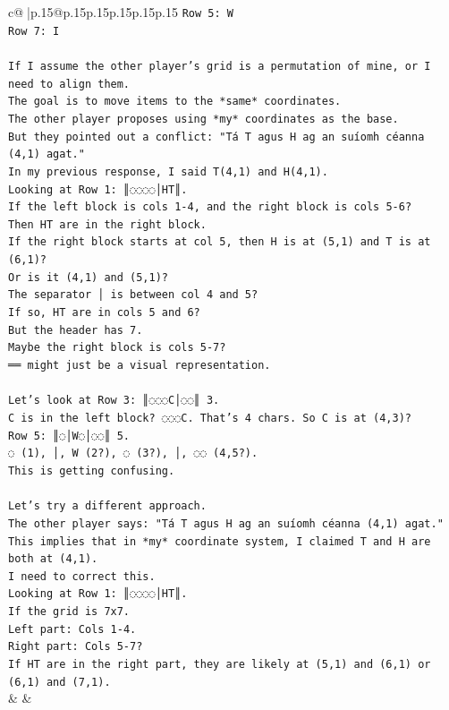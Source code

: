 \documentclass{article}
\begin{document}
{\begin{supertabular}{c@{$\;$}|p{.15\linewidth}@{}p{.15\linewidth}p{.15\linewidth}p{.15\linewidth}p{.15\linewidth}p{.15\linewidth}}
{{{\texttt{Row 5: W} \\
\texttt{Row 7: I} \\
\\ 
\texttt{If I assume the other player's grid is a permutation of mine, or I need to align them.} \\
\texttt{The goal is to move items to the *same* coordinates.} \\
\texttt{The other player proposes using *my* coordinates as the base.} \\
\texttt{But they pointed out a conflict: "Tá T agus H ag an suíomh céanna (4,1) agat."} \\
\texttt{In my previous response, I said T(4,1) and H(4,1).} \\
\texttt{Looking at Row 1: ║◌◌◌◌│HT║.} \\
\texttt{If the left block is cols 1{-}4, and the right block is cols 5{-}6?} \\
\texttt{Then HT are in the right block.} \\
\texttt{If the right block starts at col 5, then H is at (5,1) and T is at (6,1)?} \\
\texttt{Or is it (4,1) and (5,1)?} \\
\texttt{The separator │ is between col 4 and 5?} \\
\texttt{If so, HT are in cols 5 and 6?} \\
\texttt{But the header has 7.} \\
\texttt{Maybe the right block is cols 5{-}7?} \\
\texttt{══ might just be a visual representation.} \\
\\ 
\texttt{Let's look at Row 3: ║◌◌◌C│◌◌║ 3.} \\
\texttt{C is in the left block? ◌◌◌C. That's 4 chars. So C is at (4,3)?} \\
\texttt{Row 5: ║◌│W◌│◌◌║ 5.} \\
\texttt{◌ (1), │, W (2?), ◌ (3?), │, ◌◌ (4,5?).} \\
\texttt{This is getting confusing.} \\
\\ 
\texttt{Let's try a different approach.} \\
\texttt{The other player says: "Tá T agus H ag an suíomh céanna (4,1) agat."} \\
\texttt{This implies that in *my* coordinate system, I claimed T and H are both at (4,1).} \\
\texttt{I need to correct this.} \\
\texttt{Looking at Row 1: ║◌◌◌◌│HT║.} \\
\texttt{If the grid is 7x7.} \\
\texttt{Left part: Cols 1{-}4.} \\
\texttt{Right part: Cols 5{-}7?} \\
\texttt{If HT are in the right part, they are likely at (5,1) and (6,1) or (6,1) and (7,1).} \\
            }
        }
    }
    & & \\ \\


\end{supertabular}}
\end{document}

